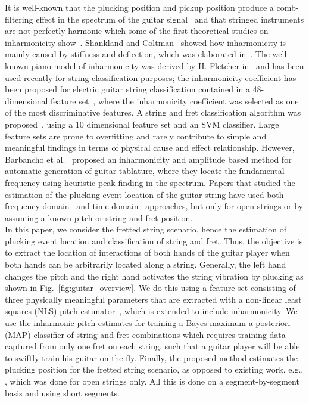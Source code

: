 \documentclass{article}
\begin{document}
It is well-known that the plucking position and pickup position produce a comb-filtering effect in the spectrum of the guitar signal~\cite{fletcher:plucked_strings,fletcher:principles_of_vibration_and_sound} and that stringed instruments are not perfectly harmonic which some of the first theoretical studies on inharmonicity show~\cite{donkin:acoustics,rayleigh:sound}. Shankland and Coltman~\cite{coltShank} showed how inharmonicity is mainly caused by stiffness and deflection, which was elaborated in~\cite{rossing:science_of_string_instruments}. The well-known piano model of inharmonicity was derived by H. Fletcher in~\cite{fletcher:piano_model} and has been used recently for string classification purposes; the inharmonicity coefficient has been proposed for electric guitar string classification contained in a 48-dimensional feature set~\cite{abesser:automatic_string_detection_ml}, where the inharmonicity coefficient was selected as one of the most discriminative features. A string and fret classification algorithm was proposed~\cite{dittmar:realtime_string_detection}, using a 10 dimensional feature set and an SVM classifier. Large feature sets are prone to overfitting and rarely contribute to simple and meaningful findings in terms of physical cause and effect relationship. However, Barbancho et al.~\cite{barbancho:inharmonicity_tablature} proposed an inharmonicity and amplitude based method for automatic generation of guitar tablature, where they locate the fundamental frequency using heuristic peak finding in the spectrum. Papers that studied the estimation of the plucking event location of the guitar string have used both frequency-domain~\cite{DBLP:conf/icassp/MohamadDH17,traube:pluckin_point_dafx,traube2003extraction} and time-domain~\cite{penttinen2004time} approaches, but only for open strings or by assuming a known pitch or string and fret position. \\
%
\indent In this paper, we consider the fretted string scenario, hence the estimation of plucking event location and classification of string and fret. Thus, the objective is to extract the location of interactions of both hands of the guitar player when both hands can be arbitrarily located along a string. Generally, the left hand changes the pitch and the right hand activates the string vibration by plucking as shown in Fig.~\ref{fig:guitar_overview}. We do this using a feature set consisting of three physically meaningful parameters that are extracted with a non-linear least squares (NLS) pitch estimator~\cite{nielsen2017fast,multipitch,hansen2018parametric,DBLP:journals/sigpro/ChristensenSJJ08}, which is extended to include inharmonicity.  We use the inharmonic pitch estimates for training a Bayes maximum a posteriori (MAP) classifier of string and fret combinations which requires training data captured from only one fret on each string, such that a guitar player will be able to swiftly train his guitar on the fly.  Finally, the proposed method estimates the plucking position for the fretted string scenario, as opposed to existing work, e.g.,  \cite{traube:pluckin_point_dafx,DBLP:conf/icassp/MohamadDH17}, which was done for open strings only. All this is done on a segment-by-segment basis and using short segments.
\end{document}
